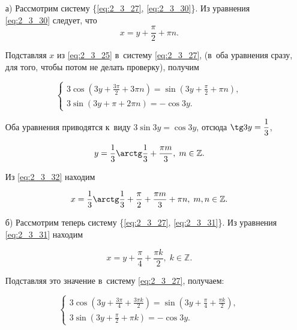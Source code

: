\begin{itemize} 
\item[а)] Рассмотрим систему \{\eqref{eq:2_3_27}, \eqref{eq:2_3_30}\}.
Из уравнения \eqref{eq:2_3_30} следует, что
\begin{equation}\label{eq:2_3_32}
\displaystyle x = y + \frac{\pi}{2} + \pi n.
\end{equation}

\noindent
Подставляя $x$ из \eqref{eq:2_3_25} в~систему \eqref{eq:2_3_27},
(в~оба уравнения сразу, для того, чтобы потом не делать проверку), получим

\begin{equation*}
\begin{cases}
\displaystyle 3 \cos \left( 3y + \frac{3\pi}{2} + 3 \pi n \right ) = 
\sin \left( 3y + \frac{\pi}{2} + \pi n \right), \\
3 \sin \left( 3y + \pi + 2 \pi n \right ) = -\cos 3y.
\end{cases}
\end{equation*}

\noindent
Оба уравнения приводятся к~виду
$3 \sin 3y = \cos 3y$, отсюда $\displaystyle \tg 3y = \frac{1}{3}$,

\begin{equation}\label{eq:2_3_33}
\displaystyle y = \frac{1}{3} \arctg \frac{1}{3} + \frac{\pi m}{3}, \;
m \in \mathbb{Z}.
\end{equation}

\noindent
Из \eqref{eq:2_3_32} находим

\begin{equation}\label{eq:2_3_34}
\displaystyle x = \frac{1}{3} \arctg \frac{1}{3} + \frac{\pi}{2} + \frac{\pi m}{3} + \pi n, \;
m, n \in \mathbb{Z}.
\end{equation}

\item[б)] Рассмотрим теперь систему \{\eqref{eq:2_3_27}, \eqref{eq:2_3_31}\}.
Из уравнения \eqref{eq:2_3_31} находим

\begin{equation}\label{eq:2_3_35}
\displaystyle x = y + \frac{\pi}{4} + \frac{\pi k}{2}, \; k \in \mathbb{Z}.
\end{equation}

\noindent
Подставляя это значение в~систему \eqref{eq:2_3_27}, получаем:

\begin{equation}\label{eq:2_3_36}
\begin{cases}
\displaystyle 3 \cos
\left(
3y + \frac{3\pi}{4} + \frac{3 \pi k}{2}
\right) =
\sin 
\left(
3y + \frac{\pi}{4} + \frac{\pi k}{2} 
\right), \\[10pt]
\displaystyle 3 \sin
\left(
3y + \frac{\pi}{2} + \pi k 
\right) =
-\cos 3y.
\end{cases}
\end{equation}


\end{itemize}
